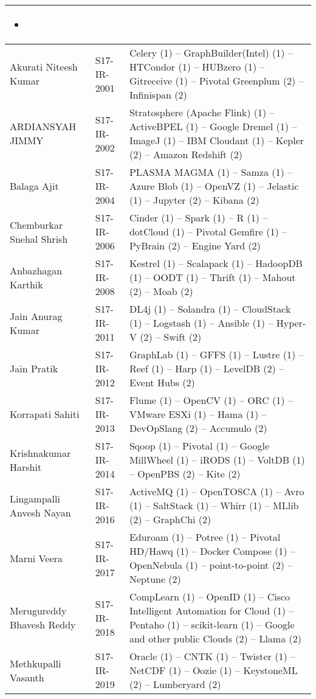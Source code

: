 \begin{longtable}{|*{3}{p{}|}}
\begin{itemize}
\item {} 
\end{itemize}
\\
\hline
Akurati	Niteesh Kumar
&
S17-IR-2001
&
Celery (1) -- GraphBuilder(Intel) (1) -- HTCondor (1) -- HUBzero (1) -- Gitreceive (1) -- Pivotal Greenplum (2) -- Infinispan (2)
\\
\hline
ARDIANSYAH	JIMMY
&
S17-IR-2002
&
Stratosphere (Apache Flink) (1) -- ActiveBPEL (1) -- Google Dremel (1) -- ImageJ (1) -- IBM Cloudant (1) -- Kepler (2) -- Amazon Redshift (2)
\\
\hline
Balaga	Ajit
&
S17-IR-2004
&
PLASMA MAGMA (1) -- Samza (1) -- Azure Blob (1) -- OpenVZ (1) -- Jelastic (1) -- Jupyter (2) -- Kibana (2)
\\
\hline
Chemburkar	Snehal Shrish
&
S17-IR-2006
&
Cinder (1) -- Spark (1) -- R (1) -- dotCloud (1) -- Pivotal Gemfire (1) -- PyBrain (2) -- Engine Yard (2)
\\
\hline
Anbazhagan	Karthik
&
S17-IR-2008
&
Kestrel (1) -- Scalapack (1) -- HadoopDB (1) -- OODT (1) -- Thrift (1) -- Mahout (2) -- Moab (2)
\\
\hline
Jain	Anurag Kumar
&
S17-IR-2011
&
DL4j (1) -- Solandra (1) -- CloudStack (1) -- Logstash (1) -- Ansible (1) -- Hyper-V (2) -- Swift (2)
\\
\hline
Jain	Pratik
&
S17-IR-2012
&
GraphLab (1) -- GFFS (1) -- Lustre (1) -- Reef (1) -- Harp (1) -- LevelDB (2) -- Event Hubs (2)
\\
\hline
Korrapati	Sahiti
&
S17-IR-2013
&
Flume (1) -- OpenCV (1) -- ORC (1) -- VMware ESXi (1) -- Hama (1) -- DevOpSlang (2) -- Accumulo (2)
\\
\hline
Krishnakumar	Harshit
&
S17-IR-2014
&
Sqoop (1) -- Pivotal (1) -- Google MillWheel (1) -- iRODS (1) -- VoltDB (1) -- OpenPBS (2) -- Kite (2)
\\
\hline
Lingampalli	Anvesh Nayan
&
S17-IR-2016
&
ActiveMQ (1) -- OpenTOSCA (1) -- Avro (1) -- SaltStack (1) -- Whirr (1) -- MLlib (2) -- GraphChi (2)
\\
\hline
Marni	Veera
&
S17-IR-2017
&
Eduroam (1) -- Potree (1) -- Pivotal HD/Hawq (1) -- Docker Compose (1) -- OpenNebula (1) -- point-to-point (2) -- Neptune (2)
\\
\hline
Merugureddy	Bhavesh Reddy
&
S17-IR-2018
&
CompLearn (1) -- OpenID (1) -- Cisco Intelligent Automation for Cloud (1) -- Pentaho (1) -- scikit-learn (1) -- Google and other public Clouds (2) -- Llama (2)
\\
\hline
Methkupalli	Vasanth
&
S17-IR-2019
&
Oracle (1) -- CNTK (1) -- Twister (1) -- NetCDF (1) -- Oozie (1) -- KeystoneML (2) -- Lumberyard (2)

\end{longtable}
